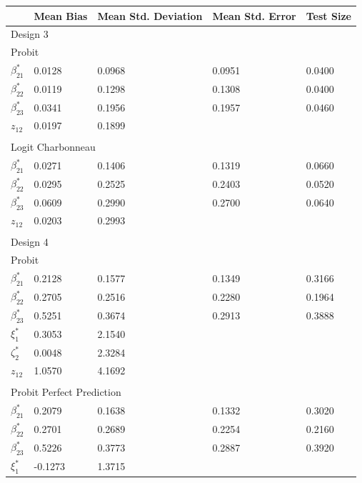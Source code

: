 \begin{table}
\small
\centering
\begin{tabular}{p{3cm}p{1.8cm}p{1.8cm}p{1.8cm}p{1.8cm}}
  \hline
   \quad & Mean Bias & Mean Std. Deviation & Mean Std. Error & Test Size \\
   \hline
   \multicolumn{5}{l}{Design 3} \\
   \hline
    \multicolumn{5}{l}{Probit} \\
    $\beta_{21}^*$ & 0.0128 & 0.0968 & 0.0951 & 0.0400\\
    $\beta_{22}^*$ & 0.0119 & 0.1298 & 0.1308 & 0.0400 \\
    $\beta_{23}^*$ & 0.0341 & 0.1956 & 0.1957 & 0.0460\\
     $z_{12}$ & 0.0197 & 0.1899 &  & \\
     & & & & \\
    \hline
    \multicolumn{5}{l}{Logit Charbonneau} \\
    $\beta_{21}^*$ & 0.0271 & 0.1406 & 0.1319 & 0.0660\\
    $\beta_{22}^*$ & 0.0295 & 0.2525 & 0.2403 & 0.0520\\
    $\beta_{23}^*$ & 0.0609 & 0.2990 & 0.2700& 0.0640\\
    $z_{12}$ & 0.0203 & 0.2993 &  & \\
    & & & & \\
   \hline
   \multicolumn{5}{l}{Design 4} \\
   \hline
    \multicolumn{5}{l}{Probit} \\
    $\beta_{21}^*$ & 0.2128 & 0.1577 & 0.1349 & 0.3166\\
    $\beta_{22}^*$ & 0.2705 & 0.2516 & 0.2280 & 0.1964\\
    $\beta_{23}^*$ & 0.5251 & 0.3674 & 0.2913 & 0.3888\\
    $\xi_{1}^*$ & 0.3053 & 2.1540 & & \\
    $\zeta_{2}^*$ & 0.0048 & 2.3284 & & \\
    $z_{12}$ & 1.0570 & 4.1692 &  & \\
    & & & & \\
    \hline
    \multicolumn{5}{l}{Probit Perfect Prediction} \\
    $\beta_{21}^*$ & 0.2079 & 0.1638 & 0.1332 & 0.3020\\
    $\beta_{22}^*$ & 0.2701 & 0.2689 & 0.2254 & 0.2160\\
    $\beta_{23}^*$ & 0.5226 & 0.3773 & 0.2887 & 0.3920\\
    $\xi_{1}^*$ & -0.1273 & 1.3715 & & \\

\end{tabular}
\end{table}
